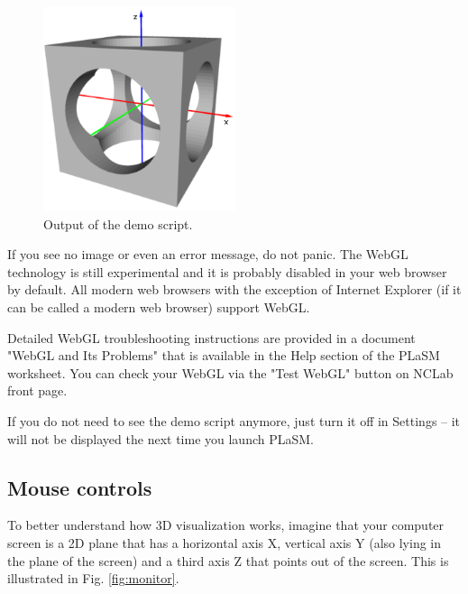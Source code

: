 \newpage
 
\begin{figure}[!ht]
\begin{center}
\includegraphics[width=0.5\textwidth]{img/demo-111.png}
\end{center}
\vspace{-4mm}
\caption{Output of the demo script.}
\label{fig:demo-111}
\end{figure}
\noindent
If you see no image or even an error message, do not panic. The WebGL 
technology is still experimental and it is probably disabled in your web 
browser by default. All modern web browsers with the exception of
Internet Explorer (if it can be called a modern web browser) support 
WebGL.  \\

\begin{gbox}
\begin{center}
Detailed WebGL troubleshooting 
instructions are provided in a document "WebGL and Its Problems" 
that is available in the Help section of the PLaSM worksheet.
You can check your WebGL via the "Test WebGL" button on NCLab front page.
\end{center}
\end{gbox}
\vspace{6mm}

\noindent
If you do not need to see the demo script anymore, just turn it off in Settings -- it 
will not be displayed the next time you launch PLaSM.

\subsection{Mouse controls}

To better understand how 3D visualization works, imagine that your computer 
screen is a 2D plane that has a horizontal axis X, vertical axis Y (also lying in the 
plane of the screen) and a third axis Z that points out of the screen.
This is illustrated in Fig. \ref{fig:monitor}.
\newpage

